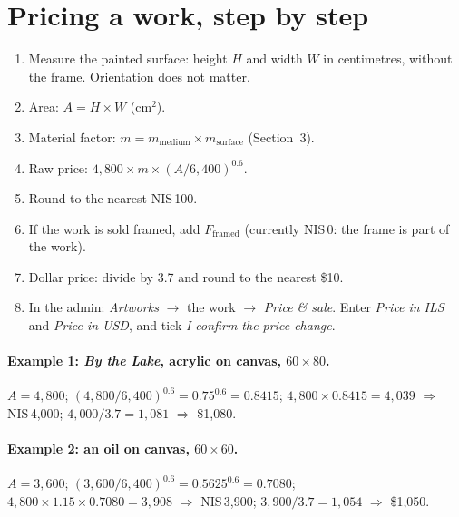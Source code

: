 \documentclass[11pt,a4paper]{article}
\newcommand{\nis}[1]{NIS\,#1}
\begin{document}
\section{Pricing a work, step by step}
\begin{enumerate}
  \item Measure the painted surface: height $H$ and width $W$ in centimetres, without the frame.
    Orientation does not matter.
  \item Area: $A = H \times W$ (cm$^2$).
  \item Material factor: $m = m_{\text{medium}} \times m_{\text{surface}}$ (Section~3).
  \item Raw price: $4{,}800 \times m \times (A / 6{,}400)^{0.6}$.
  \item Round to the nearest \nis{100}.
  \item If the work is sold framed, add $F_{\text{framed}}$ (currently \nis{0}: the frame is part of
    the work).
  \item Dollar price: divide by 3.7 and round to the nearest \$10.
  \item In the admin: \emph{Artworks} $\rightarrow$ the work $\rightarrow$ \emph{Price \& sale}.
    Enter \emph{Price in ILS} and \emph{Price in USD}, and tick \emph{I confirm the price change}.
\end{enumerate}

\paragraph{Example 1: \emph{By the Lake}, acrylic on canvas, $60\times80$.}
$A = 4{,}800$; $(4{,}800/6{,}400)^{0.6} = 0.75^{0.6} = 0.8415$; $4{,}800 \times 0.8415 = 4{,}039$
$\Rightarrow$ \nis{4{,}000}; $4{,}000/3.7 = 1{,}081$ $\Rightarrow$ \$1{,}080.

\paragraph{Example 2: an oil on canvas, $60\times60$.}
$A = 3{,}600$; $(3{,}600/6{,}400)^{0.6} = 0.5625^{0.6} = 0.7080$;
$4{,}800 \times 1.15 \times 0.7080 = 3{,}908$ $\Rightarrow$ \nis{3{,}900};
$3{,}900/3.7 = 1{,}054$ $\Rightarrow$ \$1{,}050.
\end{document}
